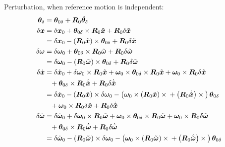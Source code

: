 \documentclass[10pt,dvips,fleqn,subeqn]{report}
\newcommand{\T}[1]{\bm{#1}}
\newcommand{\TT}[1]{\bm{#1}}
\begin{document}
Perturbation, when reference motion is independent:
\begin{subequations}
\begin{align}
	\T{\theta}_{\delta}
		&= \T{\theta}_{0\delta}
	+ \TT{R}_0 \tilde{\T{\theta}}_{\delta} \\
	\delta\T{x}
		&= \delta\T{x}_0
		+ \T{\theta}_{0\delta}\times\TT{R}_0 \tilde{\T{x}}
		+ \TT{R}_0 \delta\tilde{\T{x}}
		\nonumber \\
		&= \delta\T{x}_0
		- \plbr{\TT{R}_0 \tilde{\T{x}}} \times \T{\theta}_{0\delta}
		+ \TT{R}_0 \delta\tilde{\T{x}} \\
	\delta \T{\omega}
		&= \delta\T{\omega}_0
		+ \T{\theta}_{0\delta}\times\TT{R}_0 \tilde{\T{\omega}}
		+ \TT{R}_0 \delta\tilde{\T{\omega}}
		\nonumber \\
		&= \delta\T{\omega}_0
		- \plbr{\TT{R}_0 \tilde{\T{\omega}}} \times \T{\theta}_{0\delta}
		+ \TT{R}_0 \delta\tilde{\T{\omega}} \\
	\delta\dot{\T{x}}
		&= \delta\dot{\T{x}}_0
		+ \delta\T{\omega}_0 \times \TT{R}_0 \tilde{\T{x}}
		+ \T{\omega}_0 \times \T{\theta}_{0\delta}\times\TT{R}_0 \tilde{\T{x}}
		+ \T{\omega}_0 \times \TT{R}_0 \delta\tilde{\T{x}}
		\nonumber \\
		&\hphantom{=}+ \T{\theta}_{0\delta}\times\TT{R}_0 \dot{\tilde{\T{x}}}
		+ \TT{R}_0 \delta\dot{\tilde{\T{x}}}
		\nonumber \\
		&= \delta\dot{\T{x}}_0
		- \plbr{\TT{R}_0 \tilde{\T{x}}} \times \delta\T{\omega}_0
		- \plbr{
			\T{\omega}_0 \times \plbr{\TT{R}_0 \tilde{\T{x}}} \times{}
			+ \plbr{\TT{R}_0 \dot{\tilde{\T{x}}}}\times{}
		}\T{\theta}_{0\delta}
		\nonumber \\
		&\hphantom{=}+ \T{\omega}_0 \times \TT{R}_0 \delta\tilde{\T{x}}
		+ \TT{R}_0 \delta\dot{\tilde{\T{x}}} \\
	\delta\dot{\T{\omega}}
		&= \delta\dot{\T{\omega}}_0
		+ \delta\T{\omega}_0 \times \TT{R}_0 \tilde{\T{\omega}}
		+ \T{\omega}_0 \times \T{\theta}_{0\delta}\times\TT{R}_0 \tilde{\T{\omega}}
		+ \T{\omega}_0 \times \TT{R}_0 \delta\tilde{\T{\omega}}
		\nonumber \\
		&\hphantom{=}+ \T{\theta}_{0\delta}\times\TT{R}_0 \dot{\tilde{\T{\omega}}}
		+ \TT{R}_0 \delta\dot{\tilde{\T{\omega}}}
		\nonumber \\
		&= \delta\dot{\T{\omega}}_0
		- \plbr{\TT{R}_0 \tilde{\T{\omega}}} \times \delta\T{\omega}_0
		- \plbr{
			\T{\omega}_0 \times \plbr{\TT{R}_0 \tilde{\T{\omega}}}\times{}
			+ \plbr{\TT{R}_0 \dot{\tilde{\T{\omega}}}}\times{}
		}\T{\theta}_{0\delta}

\end{align}
\end{subequations}
\end{document}
